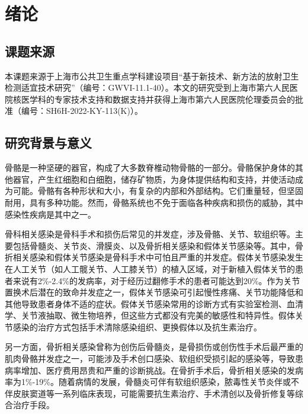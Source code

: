 \chapter{绪论}\label{chap:introduction}

\section{课题来源}

本课题来源于上海市公共卫生重点学科建设项目“基于新技术、新方法的放射卫生检测适宜技术研究”（编号：GWVI-11.1-40）。本文的研究受到上海市第六人民医院核医学科的专家技术支持和数据支持并获得上海市第六人民医院伦理委员会的批准（编号：SH6H-2022-KY-113(K)）。

\section{研究背景与意义}

骨骼是一种坚硬的器官\cite{morgan2021bone}，构成了大多数脊椎动物骨骼的一部分。骨骼保护身体的其他器官，产生红细胞和白细胞，储存矿物质，为身体提供结构和支持，并使活动成为可能。骨骼有各种形状和大小，有复杂的内部和外部结构\cite{de2021vertebrate}。它们重量轻，但坚固耐用，具有多种功能。然而，骨骼系统也不免于面临各种疾病和损伤的威胁，其中感染性疾病是其中之一。

骨科相关感染是骨科手术和损伤后常见的并发症，涉及骨骼、关节、软组织等。主要包括骨髓炎、关节炎、滑膜炎、以及骨折相关感染和假体关节感染等。其中，骨折相关感染和假体关节感染是骨科手术中可怕且严重的并发症\cite{sidiropoulos2022viral}。假体关节感染发生在人工关节（如人工髋关节、人工膝关节）的植入区域，对于新植入假体关节的患者来说有2\%-2.4\%的发病率，对于经历过翻修手术的患者可能达到20\%\cite{sconfienza2019diagnosis}。作为关节置换术后潜在的致命并发症之一\cite{niccoli2017bone,usuelli2019infections}，假体关节感染可引起慢性疼痛、关节功能降低和其他导致患者身体不适的症状\cite{aleksyniene2022role}。假体关节感染常用的诊断方式有实验室检测、血清学、关节液抽取、微生物培养，但这些方式都没有完美的敏感性和特异性\cite{meermans2010there,parvizi2012mark,fink2013high,paul20142013,fink2018preoperative,claassen2014preoperative}。假体关节感染的治疗方式包括手术清除感染组织、更换假体以及抗生素治疗。

另一方面，骨折相关感染曾称为创伤后骨髓炎，是骨损伤或创伤性手术后最严重的肌肉骨骼并发症之一\cite{govaert2020diagnosing}，可能涉及手术创口感染、软组织受损引起的感染等，导致患病率增加、医疗费用昂贵和严重的诊断挑战\cite{metsemakers2017infection}。在骨折手术后，骨折相关感染的发病率为1\%-19\%\cite{ktistakis2014infection, malhotra2014open}。随着病情的发展，骨髓炎可伴有软组织感染，脓毒性关节炎伴或不伴皮肤窦道等一系列临床表现\cite{bhoil2019role}，可能需要抗生素治疗、手术清创以及骨折修复等综合治疗手段。

